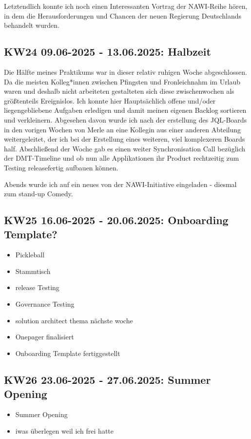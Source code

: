 Letztendlich konnte ich noch einen Interessanten Vortrag der \ac{NAWI}-Reihe hören, in dem die Herausforderungen und Chancen der neuen Regierung Deutschlands behandelt wurden.


\subsection{KW24 09.06-2025 - 13.06.2025: Halbzeit}
Die Hälfte meines Praktikums war in dieser relativ ruhigen Woche abgeschlossen. 
Da die meisten Kolleg*innen zwischen Pfingsten und Fronleichnahm im Urlaub waren und deshalb nicht arbeiteten gestalteten sich diese zwischenwochen als größtenteils Ereignislos.
Ich konnte hier Hauptsächlich offene und/oder liegengebliebene Aufgaben erledigen und damit meinen eigenen Backlog sortieren und verkleinern.
Abgesehen davon wurde ich nach der erstellung des \ac{JQL}-Boards in den vorigen Wochen von Merle an eine Kollegin aus einer anderen Abteilung weitergeleitet, der ich bei der Erstellung eines weiteren, viel komplexeren Boards half.
Abschließend der Woche gab es einen weiter Synchronisation Call bezüglich der \ac{DMT}-Timeline und ob nun alle Applikationen ihr Product rechtzeitig zum Testing releasefertig aufbauen können.

Abends wurde ich auf ein neues von der \ac{NAWI}-Initiative eingeladen - diesmal zum stand-up Comedy.


\subsection{KW25 16.06-2025 - 20.06.2025: Onboarding Template?} %
\begin{itemize}
  \item Pickleball
  \item Stammtisch
  \item release Testing
  \item Governance Testing
  \item solution architect thema nächste woche
  \item Onepager finalisiert
  \item Onboarding Template fertiggestellt
\end{itemize}


\subsection{KW26 23.06-2025 - 27.06.2025: Summer Opening}
\begin{itemize}
  \item Summer Opening
  \item iwas überlegen weil ich frei hatte
\end{itemize}


